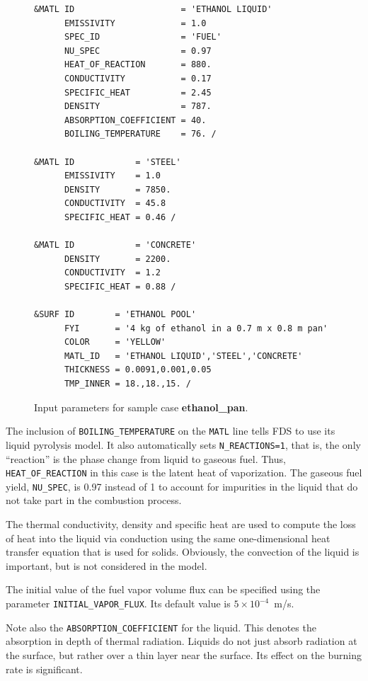 \documentclass[11pt]{book}
\newcommand{\ct}{\tt\small}
\begin{document}
\begin{figure}[ht]
\begin{minipage}{\textwidth}
\footnotesize
\begin{verbatim}
&MATL ID                     = 'ETHANOL LIQUID'
      EMISSIVITY             = 1.0
      SPEC_ID                = 'FUEL'
      NU_SPEC                = 0.97
      HEAT_OF_REACTION       = 880.
      CONDUCTIVITY           = 0.17
      SPECIFIC_HEAT          = 2.45
      DENSITY                = 787.
      ABSORPTION_COEFFICIENT = 40.
      BOILING_TEMPERATURE    = 76. /

&MATL ID            = 'STEEL'
      EMISSIVITY    = 1.0
      DENSITY       = 7850.
      CONDUCTIVITY  = 45.8
      SPECIFIC_HEAT = 0.46 /

&MATL ID            = 'CONCRETE'
      DENSITY       = 2200.
      CONDUCTIVITY  = 1.2
      SPECIFIC_HEAT = 0.88 /

&SURF ID        = 'ETHANOL POOL'
      FYI       = '4 kg of ethanol in a 0.7 m x 0.8 m pan'
      COLOR     = 'YELLOW'
      MATL_ID   = 'ETHANOL LIQUID','STEEL','CONCRETE'
      THICKNESS = 0.0091,0.001,0.05
      TMP_INNER = 18.,18.,15. /
\end{verbatim} \normalsize
\end{minipage}
\caption[Input parameters for sample case {\bf ethanol\_pan}.]{Input parameters for sample case {\bf ethanol\_pan}.}
\label{ethanol_inputs}
\end{figure}

\noindent
The inclusion of {\ct BOILING\_TEMPERATURE} on the {\ct MATL} line tells FDS to use its liquid
pyrolysis model. It also automatically sets {\ct N\_REACTIONS=1}, that is, the only ``reaction'' is the
phase change from liquid to gaseous fuel. Thus, {\ct HEAT\_OF\_REACTION} in this case is the latent
heat of vaporization. The gaseous fuel yield, {\ct NU\_SPEC}, is 0.97 instead of 1 to account for
impurities in the liquid that do not take part in the combustion process.

The thermal conductivity, density and specific heat are used to
compute the loss of heat into the liquid via conduction using the
same one-dimensional heat transfer equation that is used for solids. Obviously,
the convection of the liquid is important, but is not considered in
the model.

The initial value of the fuel vapor volume flux can be specified using
the parameter {\ct INITIAL\_VAPOR\_FLUX}. Its default value is $5 \times 10^{-4}$~m/s.

Note also the {\ct ABSORPTION\_COEFFICIENT} for the liquid. This
denotes the absorption in depth of thermal radiation. Liquids do not
just absorb radiation at the surface, but rather over a thin layer
near the surface. Its effect on the burning rate is significant.
\end{document}

